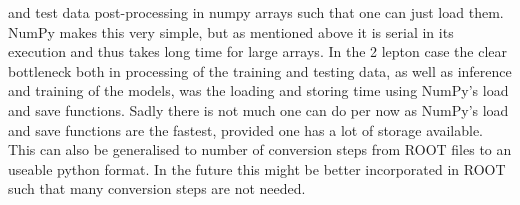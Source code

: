 and test data post-processing in numpy arrays such that one can just load them. NumPy makes this very simple, 
but as mentioned above it is serial in its execution and thus takes long time for large arrays. In the 2 lepton 
case the clear bottleneck both in processing of the training and testing data, as well as inference and training 
of the models, was the loading and storing time using NumPy's load and save functions. Sadly there is not much 
one can do per now as NumPy's load and save functions are the fastest, provided one has a lot of storage available. 
This can also be generalised to number of conversion steps from ROOT files to an useable python format. In the future
this might be better incorporated in ROOT such that many conversion steps are not needed.


